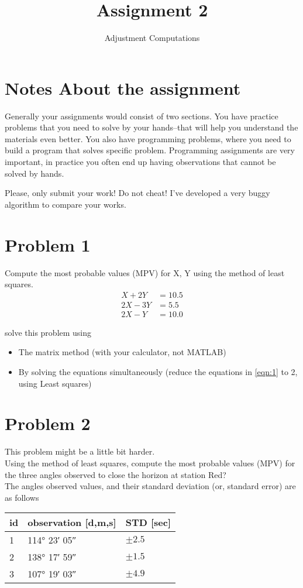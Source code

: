 \documentclass[]{scrartcl}
\title{Assignment 2}
\author{Adjustment Computations}
\begin{document}
\maketitle

\section*{Notes About the assignment}
Generally your assignments would consist of two sections. You have practice problems that you need to solve by your hands--that will help you understand the materials even better. You also have programming problems, where you need to build a program that solves specific problem. Programming assignments are very important, in practice you often end up having observations that cannot be solved by hands.

Please, only submit your work! Do not cheat! I've developed a very buggy algorithm to compare your works.

\section{Problem 1}
Compute the most probable values (MPV) for X, Y using the method of least squares.
\begin{eqnarray}
\label{eqn:1}
X + 2Y &= 10.5\\
2X - 3Y &= 5.5\\
2X - Y &= 10.0
\end{eqnarray}

solve this problem using
\begin{itemize}
	\item The matrix method (with your calculator, not MATLAB)
	\item By solving the equations simultaneously (reduce the equations in \eqref{eqn:1} to 2, using Least squares)
\end{itemize}

\section{Problem 2}
This problem might be a little bit harder.\\
Using the method of least squares, compute the most probable values (MPV) for the three angles observed to close the horizon at station Red?
\\
The angles observed values, and their standard deviation (or, standard error) are as follows

\begin{table}[]
	\centering
	\label{table:table-1}
	\begin{tabular}{@{}lll@{}}
		\toprule
		id & observation [d,m,s]& STD [sec]\\
		\midrule
		1 & \ang{114; 23; 05} & $\pm 2.5$\\
		2 & \ang{138; 17; 59} & $\pm 1.5$\\
		3 & \ang{107; 19; 03} & $\pm 4.9$\\
		\bottomrule
	\end{tabular}
\end{table}
\end{document}
